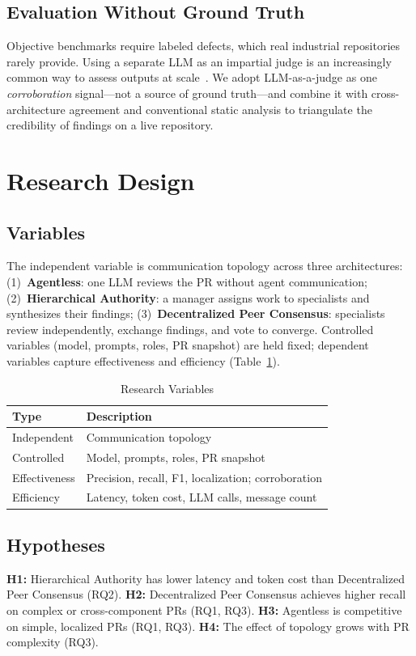 \documentclass[conference]{IEEEtran}
\begin{document}
\subsection{Evaluation Without Ground Truth}
Objective benchmarks require labeled defects, which real industrial repositories
rarely provide. Using a separate LLM as an impartial judge is an increasingly
common way to assess outputs at scale~\cite{llmjudge}. We adopt LLM-as-a-judge as
one \emph{corroboration} signal---not a source of ground truth---and combine it
with cross-architecture agreement and conventional static analysis to triangulate
the credibility of findings on a live repository.

\section{Research Design}
\subsection{Variables}
The independent variable is communication topology across three architectures:
(1)~\textbf{Agentless}: one LLM reviews the PR without agent communication;
(2)~\textbf{Hierarchical Authority}: a manager assigns work to specialists and
synthesizes their findings; (3)~\textbf{Decentralized Peer Consensus}: specialists
review independently, exchange findings, and vote to converge. Controlled
variables (model, prompts, roles, PR snapshot) are held fixed; dependent variables
capture effectiveness and efficiency (Table~\ref{tab:vars}).

\begin{table}[t]
\caption{Research Variables}
\label{tab:vars}
\centering
\begin{tabular}{@{}ll@{}}
\toprule
\textbf{Type} & \textbf{Description} \\
\midrule
Independent   & Communication topology \\
Controlled    & Model, prompts, roles, PR snapshot \\
Effectiveness & Precision, recall, F1, localization; corroboration \\
Efficiency    & Latency, token cost, LLM calls, message count \\
\bottomrule
\end{tabular}
\end{table}

\subsection{Hypotheses}
\textbf{H1:} Hierarchical Authority has lower latency and token cost than
Decentralized Peer Consensus (RQ2). \textbf{H2:} Decentralized Peer Consensus
achieves higher recall on complex or cross-component PRs (RQ1, RQ3).
\textbf{H3:} Agentless is competitive on simple, localized PRs (RQ1, RQ3).
\textbf{H4:} The effect of topology grows with PR complexity (RQ3).
\end{document}

